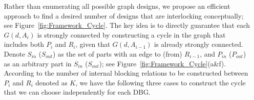 Rather than enumerating all possible graph designs, we propose an efficient approach to find a desired number of designs that are interlocking conceptually; see Figure~\ref{fig:Framework_Cycle}.
The key idea is to directly guarantee that each $G(d, A_i)$ is strongly connected by constructing a cycle in the graph that includes both $P_i$ and $R_i$, given that $G(d, A_{i-1})$ is already strongly connected.
Denote $S_{in}$ ($S_{out}$) as the set of parts with an edge to (from) $R_{i-1}$, and $P_{in}$ ($P_{out}$) as an arbitrary part in $S_{in}$ ($S_{out}$); see Figure~\ref{fig:Framework_Cycle}(a\&f).
According to the number of internal blocking relations to be constructed between $P_i$ and $R_i$ denoted as $K$,  we have the following three cases to construct the cycle that we can choose independently for each DBG. 


